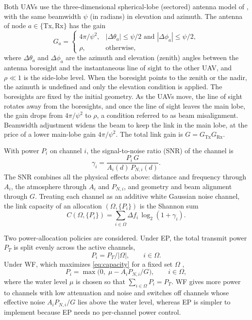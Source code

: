 \documentclass{ieee-ojvt}
\begin{document}
Both UAVs use the three-dimensional spherical-lobe (sectored) antenna model of
\cite{10399804}, with the same beamwidth $\psi$ (in radians) in elevation and
azimuth. The antenna of node $a\in\{\mathrm{Tx},\mathrm{Rx}\}$ has the gain
\begin{equation}
G_a=\begin{cases}
4\pi/\psi^{2}, & |\Delta\theta_a|\le\psi/2 \text{ and } |\Delta\phi_a|\le\psi/2,\\
\rho, & \text{otherwise},
\end{cases}
\label{eq:gain}
\end{equation}
where $\Delta\theta_a$ and $\Delta\phi_a$ are the azimuth and elevation (zenith) angles
between the antenna boresight and the instantaneous line of sight to the other UAV, and
$\rho\ll1$ is the side-lobe level. When the boresight points to the zenith or the nadir,
the azimuth is undefined and only the elevation condition is applied. The boresights are
fixed by the initial geometry. As the UAVs move, the line of sight rotates away from the
boresights, and once the line of sight leaves the main lobe, the gain drops from
$4\pi/\psi^2$ to $\rho$, a condition referred to as beam misalignment. Beamwidth
adjustment widens the beam to keep the link in the main lobe, at the price of a lower
main-lobe gain $4\pi/\psi^2$. The total link gain is $G=G_{\mathrm{Tx}}G_{\mathrm{Rx}}$.

With power $P_i$ on channel $i$, the signal-to-noise ratio (SNR) of the channel is
\begin{equation}
\gamma_i=\frac{P_i\,G}{A_i(d)\,P_{N,i}(d)} .
\label{eq:snr}
\end{equation}
The SNR combines all the physical effects above: distance and frequency through $A_i$,
the atmosphere through $A_i$ and $P_{N,i}$, and geometry and beam alignment through $G$.
Treating each channel as an additive white Gaussian noise channel, the link capacity of an
allocation $(\Omega,\{P_i\})$ is the Shannon sum
\begin{equation}
C(\Omega,\{P_i\})=\sum_{i\in\Omega}\Delta f_i\,\log_2\!\left(1+\gamma_i\right).
\label{eq:capacity}
\end{equation}

Two power-allocation policies are considered. Under EP, the total transmit power $P_T$ is
split evenly across the active channels,
\begin{equation}
P_i=P_T/|\Omega|,\qquad i\in\Omega .
\label{eq:ep}
\end{equation}
Under WF, which maximizes \eqref{eq:capacity} for a fixed set $\Omega$
\cite{goldsmith2005},
\begin{equation}
P_i=\max\!\big(0,\;\mu-A_iP_{N,i}/G\big),\qquad i\in\Omega ,
\label{eq:wf}
\end{equation}
where the water level $\mu$ is chosen so that $\sum_{i\in\Omega}P_i=P_T$. WF gives more
power to channels with low attenuation and noise and switches off channels whose
effective noise $A_iP_{N,i}/G$ lies above the water level, whereas EP is simpler to
implement because EP needs no per-channel power control.
\end{document}
